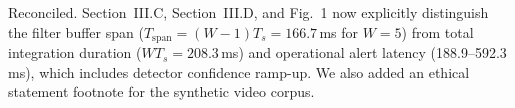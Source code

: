\documentclass[10pt]{article}
\begin{document}
Reconciled. Section~III.C, Section~III.D, and Fig.~1 now explicitly distinguish the filter buffer span ($T_{\text{span}} = (W-1)T_s = 166.7$\,ms for $W=5$) from total integration duration ($W T_s = 208.3$\,ms) and operational alert latency (188.9--592.3\,ms), which includes detector confidence ramp-up. We also added an ethical statement footnote for the synthetic video corpus.

\end{document}
